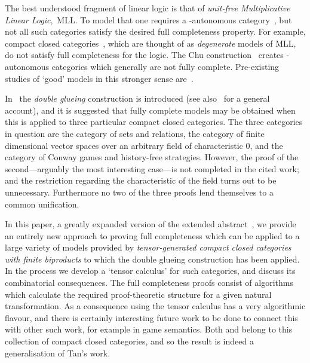\documentclass{LMCS}
\theoremstyle{plain}\newtheorem*{cLm}{Claim}
\newcommand{\mll}{MLL} \newcommand{\mall}{MALL}
\newcommand{\p}{} \newcommand{\N}{\mathbb{N}}
\newcommand{\hugh}[1]{#1}
\newcommand{\hughh}[1]{#1}
\begin{document}
\p The best understood fragment of linear logic is that of {\em
  unit-free Multiplicative Linear Logic},~\mll. To model that one
requires a -autonomous category~\cite{Bar79}, but not all such
categories satisfy the desired full completeness property. \hugh{For example, compact closed categories~\cite{KL80}, which are thought of as \emph{degenerate} models of \mll, do not satisfy full completeness for the logic. The Chu construction~\cite{Chu79} creates -autonomous categories which generally are not fully complete. Pre-existing studies of
`good' models in this stronger sense are~\cite{HO93, Loa94a, DHPP99}.}

\p In~\cite{Tan97} the {\em double glueing}\/ construction is
introduced (see also~\cite{HS03} for a general account), and it is
suggested that fully complete models may be obtained when this is
applied to three particular compact closed categories. The three
categories in question are the category  of sets and
relations, the category  of finite
dimensional vector spaces over an arbitrary field  of
characteristic 0, and the category of Conway games and history-free
strategies. However, the proof of the second---arguably the most
interesting case---is not completed in the cited work; and the
restriction regarding the characteristic of the field turns out to be
unnecessary. Furthermore no two of the three proofs lend themselves
to a common unification.

\p In this paper, a greatly expanded version of the extended abstract~\cite{SS12}, we provide an entirely new approach to proving \hughh{full completeness which can be applied to a large variety of models provided by {\em tensor-generated compact closed categories with finite biproducts} to which the double glueing construction has been applied.} 
In the process we develop a `tensor calculus' for such categories,
and discuss its combinatorial consequences. The full completeness
proofs consist of algorithms which calculate the required
proof-theoretic structure for a given natural transformation. As a
consequence using the tensor calculus has a very algorithmic flavour, and there is certainly interesting future work to be done to connect this with other such work, for example in game semantics. \hughh{Both  and  belong to this collection of compact closed categories, and so the result is indeed a generalisation of Tan's work.}
\end{document}
